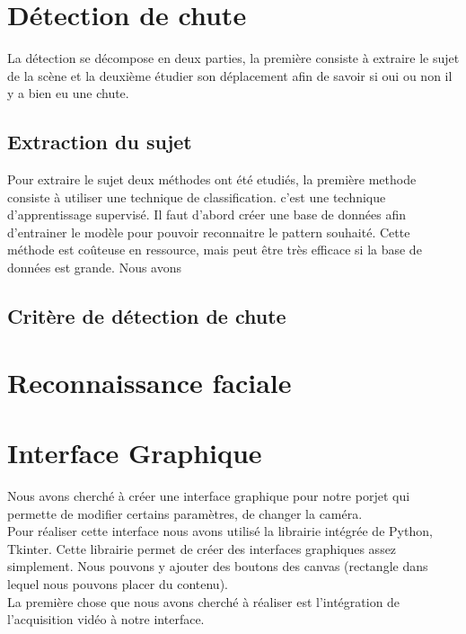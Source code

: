 \documentclass[a4paper]{report}
\begin{document}
        \section{Détection de chute}
            La détection se décompose en deux parties, la première consiste à extraire le sujet de la scène et la deuxième étudier son déplacement afin de savoir si oui ou non il y a bien eu une chute.
            \subsection{Extraction du sujet}
            Pour extraire le sujet deux méthodes ont été etudiés, la première methode consiste à utiliser une technique de classification. c'est une technique d'apprentissage supervisé. Il faut d'abord créer une base de données afin d'entrainer le modèle pour pouvoir reconnaitre le pattern souhaité. Cette méthode est coûteuse en ressource, mais peut être très efficace si la base de données est grande. Nous avons
            \subsection{Critère de détection de chute}
        \section{Reconnaissance faciale}
        \section{Interface Graphique}
            Nous avons cherché à créer une interface graphique pour notre porjet qui permette de modifier certains paramètres, de changer la caméra.\\
            Pour réaliser cette interface nous avons utilisé la librairie intégrée de Python, Tkinter. Cette librairie permet de créer des interfaces graphiques assez simplement. Nous pouvons y ajouter des boutons des canvas (rectangle dans lequel nous pouvons placer du contenu).\\
            La première chose que nous avons cherché à réaliser est l'intégration de l'acquisition vidéo à notre interface. 
\end{document}
